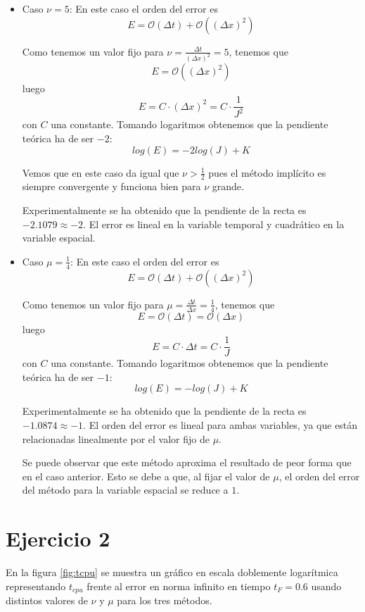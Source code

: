 \documentclass[spanish]{mathnotes}
\begin{document}
	\begin{itemize}
		\item Caso $\nu = 5$: En este caso el orden del error es
		$$E = \mathcal{O}(\Delta t) + \mathcal{O}((\Delta x)^2)$$
		
		Como tenemos un valor fijo para $\nu=\frac{\Delta t}{(\Delta x)^2}=5$, tenemos que 
		$$E = \mathcal{O}((\Delta x)^2)$$
		luego 
		$$E = C\cdot (\Delta x)^2 = C\cdot\frac{1}{J^2}$$ 
		con $C$ una constante. Tomando logaritmos obtenemos que la pendiente teórica ha de ser $-2$:
		$$log(E) = -2log(J) + K$$
		
		Vemos que en este caso da igual que $\nu > \frac{1}{2}$ pues el método implícito es siempre convergente y funciona bien para $\nu$ grande.
		
		Experimentalmente se ha obtenido que la pendiente de la recta es $-2.1079\approx -2$.  El error es lineal en la variable temporal y cuadrático en la variable espacial.
		
		\item Caso $\mu = \frac{1}{4}$: En este caso el orden del error es
		$$E = \mathcal{O}(\Delta t) + \mathcal{O}((\Delta x)^2)$$
		
		Como tenemos un valor fijo para $\mu=\frac{\Delta t}{\Delta x}=\frac{1}{4}$, tenemos que 
		$$E = \mathcal{O}(\Delta t) = \mathcal{O}(\Delta x)$$
		luego 
		$$E = C\cdot \Delta t = C\cdot\frac{1}{J}$$ 
		con $C$ una constante. Tomando logaritmos obtenemos que la pendiente teórica ha de ser $-1$:
		$$log(E) = -log(J) + K$$
		
		Experimentalmente se ha obtenido que la pendiente de la recta es $-1.0874\approx -1$. El orden del error es lineal para ambas variables, ya que están relacionadas linealmente por el valor fijo de $\mu$.
		
		Se puede observar que este método aproxima el resultado de peor forma que en el caso anterior. Esto se debe a que, al fijar el valor de $\mu$, el orden del error del método para la variable espacial se reduce a $1$.
	\end{itemize}
	
	\section{Ejercicio 2}
	En la figura \ref{fig:tcpu} se muestra un gráfico en escala doblemente logarítmica representando $t_{cpu}$ frente al error en norma infinito en tiempo $t_F = 0.6$ usando distintos valores de $\nu$ y $\mu$ para los tres métodos.
	
\end{document}

